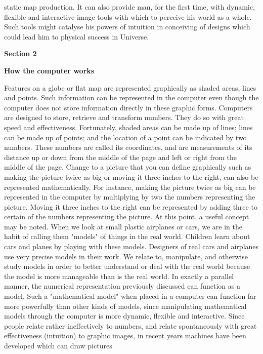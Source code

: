 static map production.  It can also provide man, for
the first time, with dynamic, flexible and interactive
image tools with which to perceive his world
as a whole.  Such tools might catalyse his powers of
intuition in conceiving of designs which could lead
him to physical success in Universe.
\vfill\eject
\centerline{\bf Section 2}
\medskip\centerline{\bf How the computer works}
\bigskip\bigskip\flushpar
Features on a globe or flat map are represented
graphically as shaded areas, lines and points.  Such
information can be represented in the computer even
though the computer does not store information directly
in these graphic forms.
\bigskip\flushpar
Computers are designed to store, retrieve and
transform numbers.  They do so with great speed and
effectiveness.  Fortunately, shaded areas can be made
up of lines; lines can be made up of points; and the
location of a point can be indicated by two numbers.
These numbers are called its coordinates, and are
measurements of its distance up or down from the middle
of the page and left or right from the middle of the
page.
\bigskip\flushpar
Change to a picture that you can define graphically
such as making the picture twice as big or moving it
three inches to the right, can also be represented
mathematically.  For instance, making the picture twice
as big can be represented in the computer by multiplying
by two the numbers representing the picture.  Moving
it three inches to the right can be represented by
adding three to certain of the numbers representing
the picture.
\bigskip\flushpar
At this point, a useful concept may be noted.  When
we look at small plastic airplanes or cars,  we are in
the habit of calling them "models" of things in the
real world.  Children learn about cars and planes by
playing with these models.  Designers of real cars and
airplanes use very precise models in their work.  We
relate to, manipulate, and otherwise study models in
order to better understand or deal with the real world
because the model is more manageable than is the real
world.
\bigskip\flushpar
In exactly a parallel manner, the numerical
representation previously discussed can function as
a model.  Such a "mathematical model" when placed in a
computer can function far more powerfully than other
kinds of models, since manipulating mathematical models
through the computer is more dynamic, flexible and
interactive.
\bigskip\flushpar
Since people relate rather ineffectively to
numbers, and relate spontaneously with great effectiveness
(intuition) to graphic images, in recent years
machines have been developed which can draw pictures
